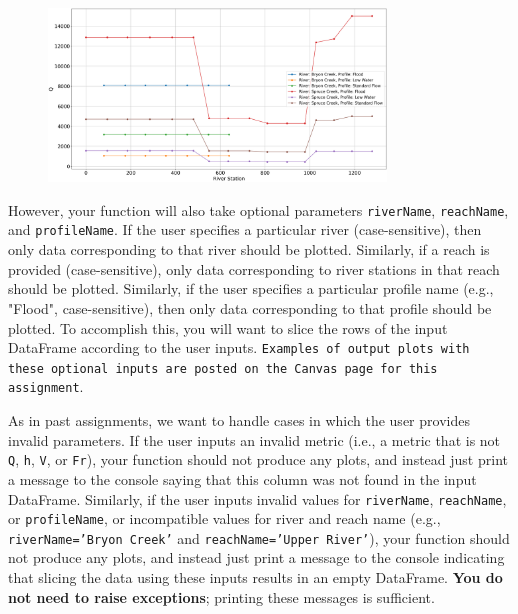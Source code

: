 \documentclass{homework}
\begin{document}
\begin{figure}
    \centering
    \includegraphics[width=0.8\textwidth]{defaultCase.png}
\end{figure}

However, your function will also take optional parameters \texttt{riverName}, \texttt{reachName}, and \texttt{profileName}. If the user specifies a particular river (case-sensitive), then only data corresponding to that river should be plotted. Similarly, if a reach is provided (case-sensitive), only data corresponding to river stations in that reach should be plotted. Similarly, if the user specifies a particular profile name (e.g., "Flood", case-sensitive), then only data corresponding to that profile should be plotted. To accomplish this, you will want to slice the rows of the input DataFrame according to the user inputs. \texttt{Examples of output plots with these optional inputs are posted on the Canvas page for this assignment}. 

As in past assignments, we want to handle cases in which the user provides invalid parameters. If the user inputs an invalid metric (i.e., a metric that is not \texttt{Q}, \texttt{h}, \texttt{V}, or \texttt{Fr}), your function should not produce any plots, and instead just print a message to the console saying that this column was not found in the input DataFrame. Similarly, if the user inputs invalid values for \texttt{riverName}, \texttt{reachName}, or \texttt{profileName}, or incompatible values for river and reach name (e.g., \texttt{riverName='Bryon Creek'} and \texttt{reachName='Upper River'}), your function should not produce any plots, and instead just print a message to the console indicating that slicing the data using these inputs results in an empty DataFrame. \textbf{You do not need to raise exceptions}; printing these messages is sufficient.




\end{document}
